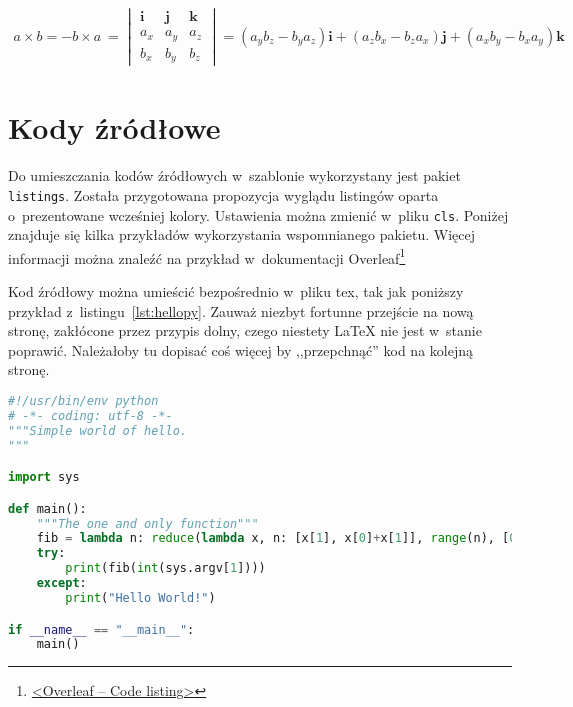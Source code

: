 \begin{gather}
    a \times b = -b \times a~=
    \begin{vmatrix}
        \pmb{i} & \pmb{j} & \pmb{k} \\
        a_x     & a_y     & a_z     \\
        b_x     & b_y     & b_z
    \end{vmatrix}
    = \left(a_y b_z - b_y a_z \right)\pmb{i}
    + \left(a_z b_x - b_z a_x \right)\pmb{j}
    + \left(a_x b_y - b_x a_y \right)\pmb{k}
\end{gather}


\section{Kody źródłowe}
Do umieszczania kodów źródłowych w~szablonie wykorzystany jest pakiet \texttt{listings}. Została przygotowana propozycja wyglądu listingów oparta o~prezentowane wcześniej kolory. Ustawienia można zmienić w~pliku \texttt{cls}. Poniżej znajduje się kilka przykładów wykorzystania wspomnianego pakietu. Więcej informacji można znaleźć na przykład w~dokumentacji Overleaf\footnote{\href{https://www.overleaf.com/learn/latex/code_listing}{<Overleaf -- Code listing>}}

Kod źródłowy można umieścić bezpośrednio w~pliku tex, tak jak poniższy przykład z~listingu~\ref{lst:hellopy}. Zauważ niezbyt fortunne przejście na nową stronę, zakłócone przez przypis dolny, czego niestety \LaTeX{} nie jest w~stanie poprawić. Należałoby tu dopisać coś więcej by ,,przepchnąć'' kod na kolejną stronę.

\begin{lstlisting}[language=Python,
    caption={Prosty program w~języku Python},
    label={lst:hellopy}]
#!/usr/bin/env python
# -*- coding: utf-8 -*-
"""Simple world of hello.
"""

import sys

def main():
    """The one and only function"""
    fib = lambda n: reduce(lambda x, n: [x[1], x[0]+x[1]], range(n), [0, 1])[0]
    try:
        print(fib(int(sys.argv[1])))
    except:
        print("Hello World!")

if __name__ == "__main__":
    main()
\end{lstlisting}

